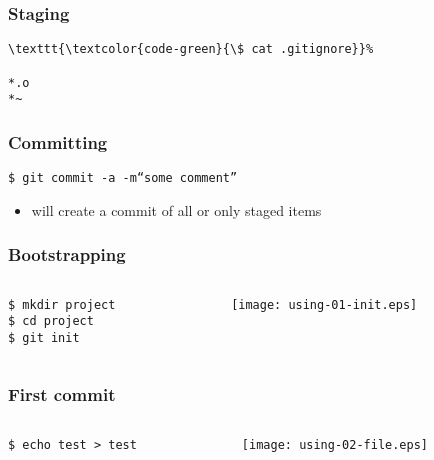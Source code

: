 \documentclass[english]{beamer}
\newcommand{\CMD}[1]{%
\texttt{\textcolor{code-green}{#1}}%
}
\newcommand{\cmd}[1]{%
\texttt{\textcolor{code-orange}{#1}}%
}
\newcommand{\fnt}[1]{%
\texttt{\textcolor{code-gray}{#1}}%
}
\newcommand{\faint}[1]{%
\textcolor{code-gray}{#1}%
}
\begin{document}
\begin{frame}[fragile]
\frametitle{Staging}

\begin{Verbatim}[commandchars=\\\{\}]
\CMD{\$ cat .gitignore}
*.o
*~
\end{Verbatim}
\end{frame}

\begin{frame}
\frametitle{Committing}

\CMD{\$ git commit \fnt{-a} -m``some comment''} \\
\begin{itemize}
        \item will create a commit of \faint{all or} only staged items
\end{itemize}
\end{frame}

\begin{frame}
\frametitle{Bootstrapping}

\begin{columns}[t]
        \begin{column}[T]{.5\textwidth}
                \cmd{\$ mkdir project} \\
                \cmd{\$ cd project} \\
                \CMD{\$ git init}
        \end{column}
        \begin{column}[T]{.5\textwidth}
                \texttt{[image: using-01-init.eps]}
        \end{column}
\end{columns}
\end{frame}

\begin{frame}
\frametitle{First commit}
\begin{columns}[t]
        \begin{column}[T]{.5\textwidth}
                \cmd{\$ echo test > test}
        \end{column}
        \begin{column}[T]{.5\textwidth}
                \texttt{[image: using-02-file.eps]}
        \end{column}
\end{columns}
\end{frame}
\end{document}
